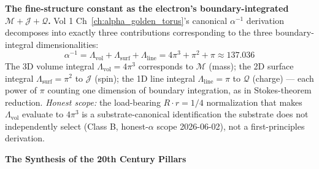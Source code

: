 \noindent\textbf{The fine-structure constant as the electron's boundary-integrated $\mathcal{M} + \mathcal{J} + \mathcal{Q}$.} Vol 1 Ch~\ref{ch:alpha_golden_torus}'s canonical $\alpha^{-1}$ derivation decomposes into exactly three contributions corresponding to the three boundary-integral dimensionalities:
\begin{equation}
    \alpha^{-1} = \Lambda_{\text{vol}} + \Lambda_{\text{surf}} + \Lambda_{\text{line}} = 4\pi^3 + \pi^2 + \pi \approx 137.036
\end{equation}
The 3D volume integral $\Lambda_{\text{vol}} = 4\pi^3$ corresponds to $\mathcal{M}$ (mass); the 2D surface integral $\Lambda_{\text{surf}} = \pi^2$ to $\mathcal{J}$ (spin); the 1D line integral $\Lambda_{\text{line}} = \pi$ to $\mathcal{Q}$ (charge) --- each power of $\pi$ counting one dimension of boundary integration, as in Stokes-theorem reduction. \emph{Honest scope:} the load-bearing $R \cdot r = 1/4$ normalization that makes $\Lambda_{\text{vol}}$ evaluate to $4\pi^3$ is a substrate-canonical identification the substrate does not independently select (Class B, honest-$\alpha$ scope 2026-06-02), not a first-principles derivation.

\vspace{1.5em}
\noindent \textbf{The Synthesis of the 20th Century Pillars}

